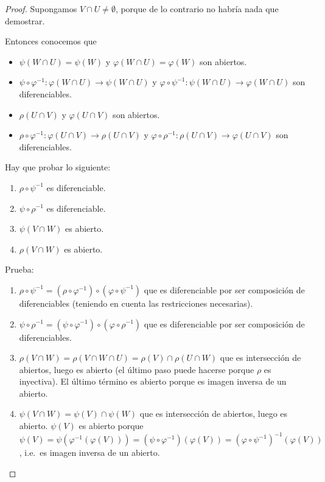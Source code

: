 \documentclass[../VD.tex]{subfiles}
\begin{document}
\begin{proof}
  Supongamos \(V \cap U \neq \emptyset\), porque de lo contrario no habría nada
  que demostrar.

  Entonces conocemos que
  \begin{itemize}
  \item \(\psi(W \cap U) = \psi(W)\) y \(\varphi(W \cap U) = \varphi(W)\) son
    abiertos.
  \item \(\psi \circ \varphi^{-1} \colon \varphi(W \cap U) \to \psi(W \cap U)\)
    y \(\varphi \circ \psi^{-1} \colon \psi(W \cap U) \to \varphi(W \cap U)\)
    son diferenciables.
  \item \(\rho(U \cap V)\) y \(\varphi(U \cap V)\) son abiertos.
  \item \(\rho \circ \varphi^{-1} \colon \varphi(U \cap V) \to \rho(U \cap V)\)
    y \(\varphi \circ \rho^{-1} \colon \rho(U \cap V) \to \varphi(U \cap V)\)
    son diferenciables.
  \end{itemize}

  Hay que probar lo siguiente:
  \begin{enumerate}
  \item \(\rho \circ \psi^{-1}\) es diferenciable.
  \item \(\psi \circ \rho^{-1}\) es diferenciable.
  \item \(\psi(V \cap W)\) es abierto.
  \item \(\rho(V \cap W)\) es abierto.
  \end{enumerate}

  Prueba:
  \begin{enumerate}
  \item \(\rho \circ \psi^{-1} = (\rho \circ \varphi^{-1}) \circ (\varphi \circ
    \psi^{-1})\) que es diferenciable por ser composición de diferenciables
    (teniendo en cuenta las restricciones necesarias).
  \item \(\psi \circ \rho^{-1} = (\psi \circ \varphi^{-1}) \circ (\varphi \circ
    \rho^{-1})\) que es diferenciable por ser composición de diferenciables.
  \item \(\rho(V \cap W) = \rho(V \cap W \cap U) = \rho(V) \cap \rho(U \cap W)\)
    que es intersección de abiertos, luego es abierto (el último paso puede
    hacerse porque \(\rho\) es inyectiva). El último término es abierto porque
    es imagen inversa de un abierto.
  \item \(\psi(V \cap W) = \psi(V) \cap \psi(W)\) que es intersección de
    abiertos, luego es abierto. \(\psi(V)\) es abierto porque \(\psi(V) =
    \psi{(\varphi^{-1}{(\varphi{(V)})})} = (\psi \circ \varphi^{-1}){(\varphi{(V)})} =
    {(\varphi \circ \psi^{-1})}^{-1}{(\varphi{(V)})}\), i.e.\ es imagen inversa de un abierto.
  \end{enumerate}
\end{proof}
\end{document}
